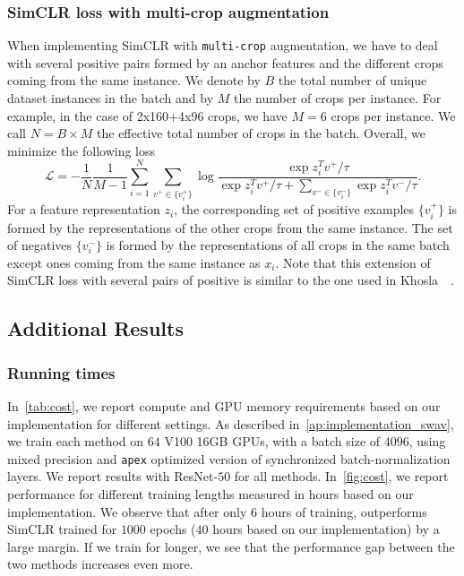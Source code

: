 \subsubsection{SimCLR loss with multi-crop augmentation}
When implementing SimCLR with \texttt{multi-crop} augmentation, we have to deal with several positive pairs formed by an anchor features and the different crops coming from the same instance.
We denote by $B$ the total number of unique dataset instances in the batch and by $M$ the number of crops per instance.
For example, in the case of 2x160+4x96 crops, we have $M=6$ crops per instance.
We call $N = B \times M$ the effective total number of crops in the batch.
Overall, we minimize the following loss
\begin{equation}
\mathcal{L} = - \frac{1}{N} \frac{1}{M - 1} \sum_{i=1}^N \sum_{v^+ \in \{v_i^+\}} \log{\frac{\exp{z_i^T v^+ / \tau}}{\exp{z_i^T v^+ / \tau} + \sum_{v^- \in \{v_i^-\}} \exp{z_i^T v^- / \tau}}}.
\end{equation}
For a feature representation $z_i$, the corresponding set of positive examples $\{v_i^+\}$ is formed by the representations of the other crops from the same instance.
The set of negatives $\{v_i^-\}$ is formed by the representations of all crops in the same batch except ones coming from the same instance as $x_i$.
Note that this extension of SimCLR loss with several pairs of positive is similar to the one used in Khosla~\etal~\cite{khosla2020supervised}.

\subsection{Additional Results}
\label{ap:results}

\subsubsection{Running times}
In~\cref{tab:cost}, we report compute and GPU memory requirements based on our implementation for different settings.
As described in~\cref{ap:implementation_swav}, we train each method on $64$ V100 16GB GPUs, with a batch size of $4096$, using mixed precision and \texttt{apex} optimized version of synchronized batch-normalization layers.
We report results with ResNet-$50$ for all methods.
In~\cref{fig:cost}, we report \OURS performance for different training lengths measured in hours based on our implementation.
We observe that after only $6$ hours of training, \OURS outperforms SimCLR trained for $1000$ epochs ($40$ hours based on our implementation) by a large margin.
If we train \OURS for longer, we see that the performance gap between the two methods increases even more.

